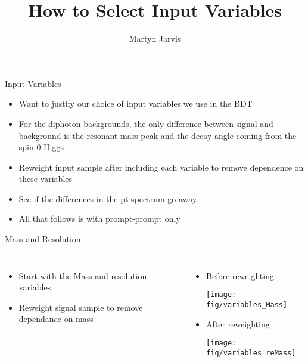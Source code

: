 \documentclass[t]{beamer}
\author{Martyn Jarvis}
\title[Input Variables]{How to Select Input Variables}
\begin{document}


\begin{frame}{Input Variables}
  \begin{itemize}  
   \item Want to justify our choice of input variables we use in the BDT
   \item For the diphoton backgrounds, the only difference between signal 
   and background is the resonant mass peak and the decay angle coming from
   the spin 0 Higgs
   \item Reweight input sample after including each variable to remove
   dependence on these variables 
   \item See if the differences in the pt spectrum go away.
   \item All that follows is with prompt-prompt only
   \end{itemize}
\end{frame}

\begin{frame}{Mass and Resolution}
  \begin{columns}[c]
  \begin{itemize}
    \item Start with the Mass and resolution variables
    \item Reweight signal sample to remove dependance on mass
  \end{itemize}
    \begin{itemize}  
      \item Before reweighting 

      \texttt{[image: fig/variables\_Mass]}
   
      \item After reweighting 

      \texttt{[image: fig/variables\_reMass]}
    \end{itemize}
  \end{columns}
\end{frame}
\end{document}
